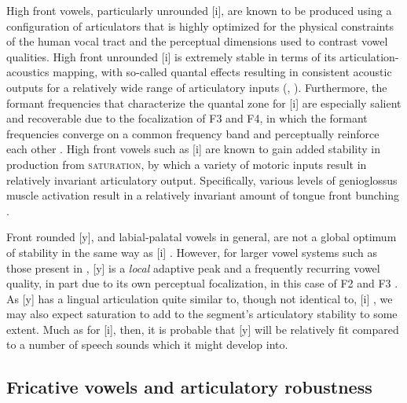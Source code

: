 \documentclass[output=paper,hidelinks]{langscibook}
\begin{document}
High front vowels, particularly unrounded [i], are known to be produced using a configuration of articulators that is highly optimized for the physical constraints of the human vocal tract and the perceptual dimensions used to contrast vowel qualities. High front unrounded [i] is extremely stable in terms of its articulation-acoustics mapping, with so-called quantal effects resulting in consistent acoustic outputs for a relatively wide range of articulatory inputs (\citealt[11--15]{stevens-nature}, \citealt[2--8]{stevens2010}). Furthermore, the formant frequencies that characterize the quantal zone for [i] are especially salient and recoverable due to the focalization of F3 and F4, in which the formant frequencies converge on a common frequency band and perceptually reinforce each other \citep[258--259]{schwartz-foc}.
%
High front vowels such as [i] are known to gain added stability in production from \textsc{saturation}, by which a variety of motoric inputs result in relatively invariant articulatory output. Specifically, various levels of genioglossus muscle activation result in a relatively invariant amount of tongue front bunching \citep{fujimura-kakita}.


Front rounded [y], and labial-palatal vowels in general, are not a global optimum of stability in the same way as [i] \citep{stevens-nature, dejong-obeng}.
%
However, for larger vowel systems such as those present in \THW{}, [y] is a \textit{local} adaptive peak and a frequently recurring vowel quality, in part due to its own perceptual focalization, in this case of F2 and F3 \citep[259]{schwartz-foc}. As [y] has a lingual articulation quite similar to, though not identical to, [i] \citep{wood-palatal}, we may also expect saturation to add to the segment's articulatory stability to some extent.
%
Much as for [i], then, it is probable that [y] will be relatively fit compared to a number of speech sounds which it might develop into.


\subsection{Fricative vowels and articulatory robustness}\label{sec:faytak:4.2}
\end{document}
